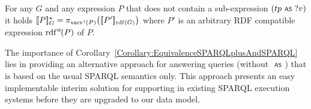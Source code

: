 \begin{corollary} \label{Corollary:EquivalenceSPARQLplusAndSPARQL}
	For any {\RDFplusGraph} $G$ and any {\SPARQLplus} expression $P$ that does not contain a sub-expression
	$(tp \text{ \normalfont\scriptsize\textsf{AS} } ?v)$ it holds $[\![P]\!]^\star_{G} = \pi_{\mathrm{vars}^+\!(P)}\bigl( [\![P']\!]_{\mathrm{rdf}(G)} \bigr)$ where $P'$ is an arbitrary RDF compatible expression $\mathrm{rdf}^{w}\!(P)$ of $P$.
\end{corollary}

\noindent
The importance of Corollary~\ref{Corollary:EquivalenceSPARQLplusAndSPARQL} lies in providing an alternative approach for answering {\SPARQLplus} queries (without $\text{ \normalfont\scriptsize\textsf{AS} }$\!) that is based on the usual SPARQL semantics only. This approach presents an easy implementable interim solution for supporting {\SPARQLplus} in existing SPARQL execution systems before they are upgraded to our {\RDFplus} data model.